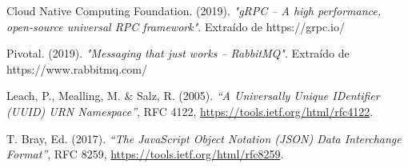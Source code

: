 \documentclass[11pt, letter]{article}
\begin{document}
\begin{thebibliography}{99}
\raggedright

 Cloud Native Computing Foundation. (2019). \textit{"gRPC -- A high performance, open-source universal RPC framework"}. Extraído de https://grpc.io/

 Pivotal. (2019). \textit{"Messaging that just works -- RabbitMQ"}. Extraído de https://www.rabbitmq.com/

 Leach, P., Mealling, M. \& Salz, R. (2005). \textit{``A Universally Unique IDentifier (UUID) URN Namespace''}, RFC 4122, \url{https://tools.ietf.org/html/rfc4122}.

 T. Bray, Ed. (2017). \textit{``The JavaScript Object Notation (JSON) Data Interchange Format''}, RFC 8259, \url{https://tools.ietf.org/html/rfc8259}.

\end{thebibliography}
\end{document}
